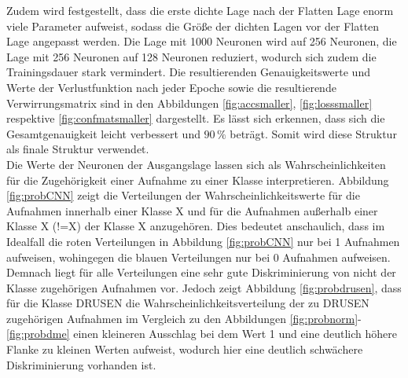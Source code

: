 \setcounter{subfigure}{0} 
Zudem wird festgestellt, dass die erste dichte Lage nach der Flatten Lage enorm viele Parameter aufweist, sodass die Grö{\ss}e der dichten Lagen vor der Flatten Lage angepasst werden. Die Lage mit 1000 Neuronen wird auf 256 Neuronen, die Lage mit 256 Neuronen auf 128 Neuronen reduziert, wodurch sich zudem die Trainingsdauer stark vermindert. Die resultierenden Genauigkeitswerte und Werte der Verlustfunktion nach jeder Epoche sowie die resultierende Verwirrungsmatrix sind in den Abbildungen \ref{fig:accsmaller}, \ref{fig:losssmaller} respektive \ref{fig:confmatsmaller} dargestellt. Es lässt sich erkennen, dass sich die Gesamtgenauigkeit leicht verbessert und $90\,\%$ beträgt. Somit wird diese Struktur als finale Struktur verwendet. \\
Die Werte der Neuronen der Ausgangslage lassen sich als Wahrscheinlichkeiten für die Zugehörigkeit einer Aufnahme zu einer Klasse interpretieren. Abbildung \ref{fig:probCNN} zeigt die Verteilungen der Wahrscheinlichkeitswerte für die Aufnahmen innerhalb einer Klasse X und für die Aufnahmen au{\ss}erhalb einer Klasse X (!=X) der Klasse X anzugehören. Dies bedeutet anschaulich, dass im Idealfall die roten Verteilungen in Abbildung \ref{fig:probCNN} nur bei 1 Aufnahmen aufweisen, wohingegen die blauen Verteilungen nur bei 0 Aufnahmen aufweisen. Demnach liegt für alle Verteilungen eine sehr gute Diskriminierung von nicht der Klasse zugehörigen Aufnahmen vor. Jedoch zeigt Abbildung \ref{fig:probdrusen}, dass für die Klasse DRUSEN die Wahrscheinlichkeitsverteilung der zu DRUSEN zugehörigen Aufnahmen im Vergleich zu den Abbildungen \ref{fig:probnorm}-\ref{fig:probdme} einen kleineren Ausschlag bei dem Wert 1 und eine deutlich höhere Flanke zu kleinen Werten aufweist, wodurch hier eine deutlich schwächere Diskriminierung vorhanden ist.  
 


